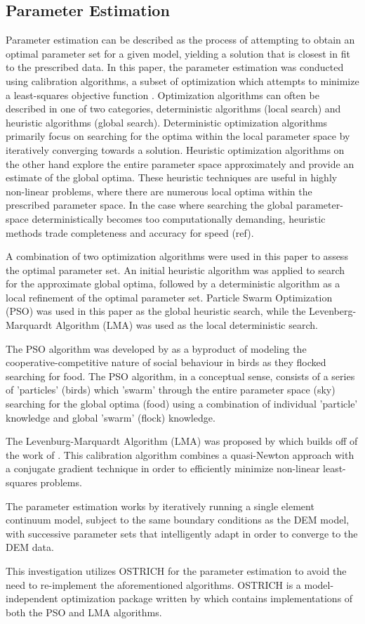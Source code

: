 \subsection{Parameter Estimation}
Parameter estimation can be described as the process of attempting to obtain an optimal parameter set for a given model, yielding a solution that is closest in fit to the prescribed data. In this paper, the parameter estimation was conducted using calibration algorithms, a subset of optimization which attempts to minimize a least-squares objective function \cite{matott_ostrich:_2008}. Optimization algorithms can often be described in one of two categories, deterministic algorithms (local search) and heuristic algorithms (global search). Deterministic optimization algorithms primarily focus on searching for the optima within the local parameter space by iteratively converging towards a solution. Heuristic optimization algorithms on the other hand explore the entire parameter space approximately and provide an estimate of the global optima. These heuristic techniques are useful in highly non-linear problems, where there are numerous local optima within the prescribed parameter space. In the case where searching the global parameter-space deterministically becomes too computationally demanding, heuristic methods trade completeness and accuracy for speed (ref). 

A combination of two optimization algorithms were used in this paper to assess the optimal parameter set. An initial heuristic algorithm was applied to search for the approximate global optima, followed by a deterministic algorithm as a local refinement of the optimal parameter set. Particle Swarm Optimization (PSO) was used in this paper as the global heuristic search, while the Levenberg-Marquardt Algorithm (LMA) was used as the local deterministic search. 

The PSO algorithm was developed by \citet{Kennedy} as a byproduct of modeling the cooperative-competitive nature of social behaviour in birds as they flocked searching for food. The PSO algorithm, in a conceptual sense, consists of a series of 'particles' (birds) which 'swarm' through the entire parameter space (sky) searching for the global optima (food) using a combination of individual 'particle' knowledge and global 'swarm' (flock) knowledge.

The Levenburg-Marquardt Algorithm (LMA) was proposed by \citet{marquardt_algorithm_1963} which builds off of the work of \citet{levenberg_method_1944}. This calibration algorithm combines a quasi-Newton approach with a conjugate gradient technique in order to efficiently minimize non-linear least-squares problems. 

The parameter estimation works by iteratively running a single element continuum model, subject to the same boundary conditions as the DEM model, with successive parameter sets that intelligently adapt in order to converge to the DEM data. 

This investigation utilizes OSTRICH for the parameter estimation to avoid the need to re-implement the aforementioned algorithms. OSTRICH is a model-independent optimization package written by \citet{matott_ostrich:_2008} which contains implementations of both the PSO and LMA algorithms.

